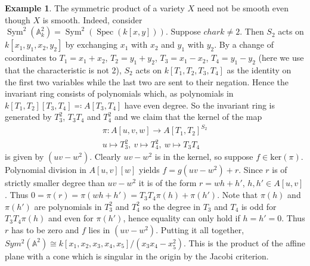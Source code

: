 \documentclass[11pt, a4paper, german, twoside]{article}
\theoremstyle{plain}
\theoremstyle{definition}
\newtheorem{example}[theorem]{Example}
\DeclareMathOperator{\Spec}{Spec}
\DeclareMathOperator{\Sym}{Sym}
\begin{document}
\begin{example}
    The symmetric product of a variety $X$ need not be smooth even though $X$ is smooth. 
    Indeed, consider $\Sym^2(\mathbb{A}_k^2) = \Sym^2(\Spec(k[x,y]))$. Suppose $char k \neq 2$.
    Then $S_2$ acts on $k[x_1,y_1,x_2,y_2]$ by exchanging $x_1$ with $x_2$ and $y_1$ with $y_2$. By a change of coordinates
    to $T_1 = x_1 + x_2$, $T_2 = y_1 + y_2$, $T_3 = x_1 - x_2$, $T_4 = y_1 - y_2$ (here we use that the characteristic is not 2),
    $S_2$ acts on $k[T_1,T_2,T_3,T_4]$ as the identity on the first two variables while the last two are sent to their negation.
    Hence the invariant ring consists of polynomials which, as polynomials in $k[T_1,T_2][T_3,T_4] \eqqcolon A[T_3,T_4]$ have even degree.
    So the invariant ring is generated by $T_3^2$, $T_3T_4$ and $T_4^2$ and we claim that the kernel of the map
    \begin{gather*}
        \pi \colon A[u,v,w] \to A[T_1,T_2]^{S_2}\\
        u \mapsto T_3^2,\ 
        v \mapsto T_4^2,\ 
        w \mapsto T_3T_4
    \end{gather*}
    is given by $(uv - w^2)$. Clearly $uv - w^2$ is in the kernel, so suppose $f \in \mathrm{ker}(\pi)$. 
    Polynomial division in $A[u,v][w]$ yields
    $f = g(uv - w^2) + r$. Since $r$ is of strictly smaller degree than $uv - w^2$ it is of the form $r = wh + h'$, $h, h' \in A[u,v]$.
    Thus $0 = \pi(r) = \pi(wh + h') = T_3T_4\pi(h) + \pi(h')$. 
    Note that $\pi(h)$ and $\pi(h')$ are polynomials in $T_3^2$ and $T_4^2$ so the degree in $T_3$ and $T_4$ is odd for 
    $T_3T_4\pi(h)$ and even for $\pi(h')$,
    hence equality can only hold if $h = h' = 0$. Thus $r$ has to be zero and $f$ lies in $(uv - w^2)$.
    Putting it all together, $Sym^2(\mathbb{A}^2) \cong k[x_1,x_2,x_3,x_4,x_5]/(x_3x_4 - x_5^2)$. This is the product of the affine plane with
    a cone which is singular in the origin by the Jacobi
    criterion.


\end{example}
\end{document}
